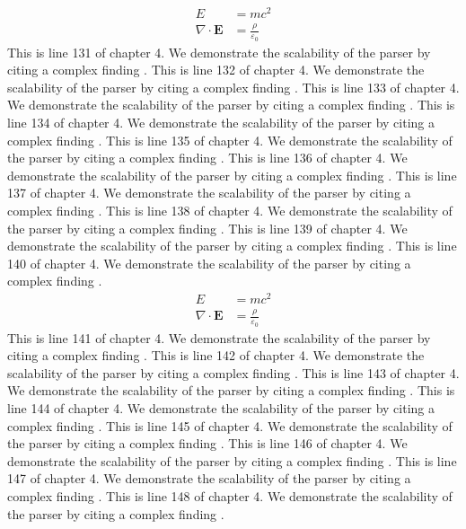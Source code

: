 \begin{align*}
  E &= mc^2 \\
  \nabla \cdot \mathbf{E} &= \frac{\rho}{\varepsilon_0}
\end{align*}
This is line 131 of chapter 4. We demonstrate the scalability of the parser by citing a complex finding \cite{ref4_131}.
This is line 132 of chapter 4. We demonstrate the scalability of the parser by citing a complex finding \cite{ref4_132}.
This is line 133 of chapter 4. We demonstrate the scalability of the parser by citing a complex finding \cite{ref4_133}.
This is line 134 of chapter 4. We demonstrate the scalability of the parser by citing a complex finding \cite{ref4_134}.
This is line 135 of chapter 4. We demonstrate the scalability of the parser by citing a complex finding \cite{ref4_135}.
This is line 136 of chapter 4. We demonstrate the scalability of the parser by citing a complex finding \cite{ref4_136}.
This is line 137 of chapter 4. We demonstrate the scalability of the parser by citing a complex finding \cite{ref4_137}.
This is line 138 of chapter 4. We demonstrate the scalability of the parser by citing a complex finding \cite{ref4_138}.
This is line 139 of chapter 4. We demonstrate the scalability of the parser by citing a complex finding \cite{ref4_139}.
This is line 140 of chapter 4. We demonstrate the scalability of the parser by citing a complex finding \cite{ref4_140}.
\begin{align*}
  E &= mc^2 \\
  \nabla \cdot \mathbf{E} &= \frac{\rho}{\varepsilon_0}
\end{align*}
This is line 141 of chapter 4. We demonstrate the scalability of the parser by citing a complex finding \cite{ref4_141}.
This is line 142 of chapter 4. We demonstrate the scalability of the parser by citing a complex finding \cite{ref4_142}.
This is line 143 of chapter 4. We demonstrate the scalability of the parser by citing a complex finding \cite{ref4_143}.
This is line 144 of chapter 4. We demonstrate the scalability of the parser by citing a complex finding \cite{ref4_144}.
This is line 145 of chapter 4. We demonstrate the scalability of the parser by citing a complex finding \cite{ref4_145}.
This is line 146 of chapter 4. We demonstrate the scalability of the parser by citing a complex finding \cite{ref4_146}.
This is line 147 of chapter 4. We demonstrate the scalability of the parser by citing a complex finding \cite{ref4_147}.
This is line 148 of chapter 4. We demonstrate the scalability of the parser by citing a complex finding \cite{ref4_148}.
